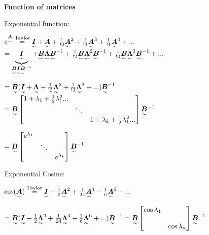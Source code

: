 \newpage
\textbf{Function of matrices}

Exponential function: 

$e^{\ma{A}}\overset{\textrm{Taylor}}{=}\ma{I}+\ma{A}+\frac{1}{!2}\ma{A}^2+\frac{1}{!3}\ma{A}^3+\frac{1}{!4}\ma{A}^4+...$
$=\underbrace{\ma{I}}_{\ma{B}\ma{I}\ma{B}^{-1}}+\ma{B}\ma{\Lambda}\ma{B}^{-1}+\frac{1}{!2}\ma{B}\ma{\Lambda}^2\ma{B}^{-1}+\frac{1}{!3}\ma{B}\ma{\Lambda}^3\ma{B}^{-1}+...$

$=\ma{B}(\ma{I}+\ma{\Lambda}+\frac{1}{!2}\ma{\Lambda}^2+\frac{1}{!3}\ma{\Lambda}^3+...)\ma{B}^{-1} $
$=\ma{B}\begin{bmatrix}1+\lambda_1+\frac{1}{2}\lambda_1^2...& & \\ &\ddots & \\ & &1+\lambda_k+\frac{1}{2}\lambda_k^2...\end{bmatrix}\ma{B}^{-1}$

$=\ma{B}\begin{bmatrix}e^{\lambda_1}& & \\ &\ddots & \\ & &e^{\lambda_k}\end{bmatrix}\ma{B}^{-1}$

Exponential Cosine: 

$\cos(\ma{A})\overset{\textrm{Taylor}}{=}\ma{I}-\frac{1}{2}\ma{A}^2+\frac{1}{24}\ma{A}^4-\frac{1}{6}\ma{A}^6+...$

$=\ma{B}(\ma{I}-\frac{1}{2}\ma{\Lambda}^2+\frac{1}{24}\ma{\Lambda}^4-\frac{1}{6}\ma{\Lambda}^6+... )\ma{B}^{-1}
=\ma{B} \begin{bmatrix}\cos\lambda_1 & \\ \\ &\cos\lambda_n\end{bmatrix} \ma{B}^{-1}$

